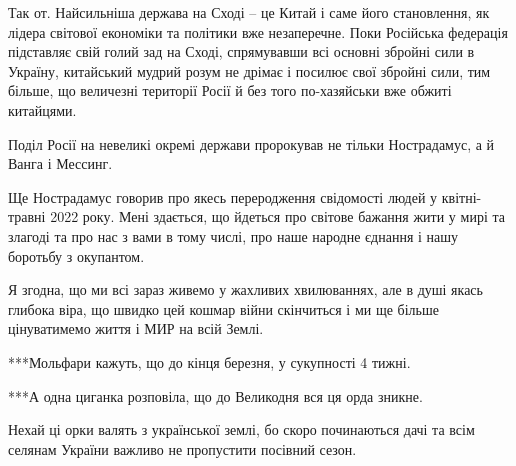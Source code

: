 
Так от. Найсильніша держава на Сході – це Китай і саме його становлення, як
лідера світової економіки та політики вже незаперечне. Поки Російська федерація
підставляє свій голий зад на Сході, спрямувавши всі основні збройні сили в
Україну, китайський мудрий розум не дрімає і посилює свої збройні сили, тим
більше, що величезні території Росії й без того по-хазяйськи вже обжиті
китайцями.

Поділ Росії на невеликі окремі держави пророкував не тільки Нострадамус, а й
Ванга і Мессинг.

Ще Нострадамус говорив про якесь переродження свідомості людей у квітні-травні
2022 року. Мені здається, що йдеться про світове бажання жити у мирі та злагоді
та про нас з вами в тому числі, про наше народне єднання і нашу боротьбу з
окупантом.

Я згодна, що ми всі зараз живемо у жахливих хвилюваннях, але в душі якась
глибока віра, що швидко цей кошмар війни скінчиться і ми ще більше цінуватимемо
життя і МИР на всій Землі.

***Мольфари кажуть, що до кінця березня, у сукупності 4 тижні.

***А одна циганка розповіла, що до Великодня вся ця орда зникне.

Нехай ці орки валять з української землі, бо скоро починаються дачі та всім
селянам України важливо не пропустити посівний сезон.

